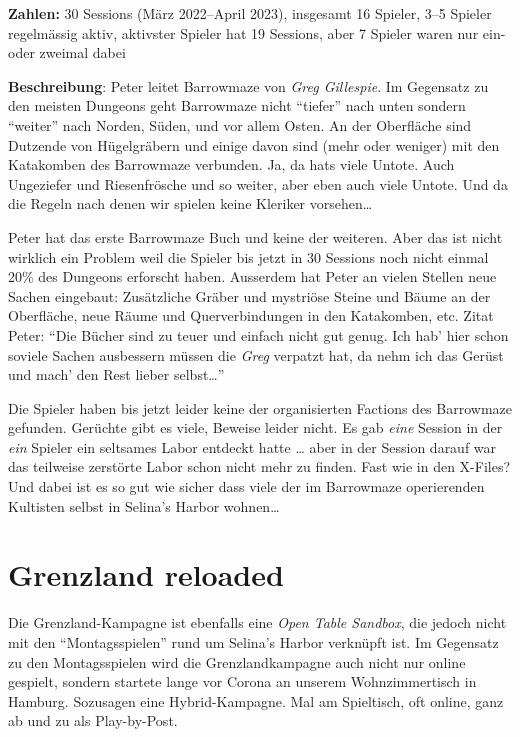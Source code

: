 \documentclass[11pt]{wbzine}
\begin{document}
\begin{multicols}{2}
\textbf{Zahlen:} 30 Sessions (März 2022--April 2023),
insgesamt 16 Spieler,
3--5 Spieler regelmässig aktiv,
aktivster Spieler hat 19 Sessions,
aber 7 Spieler waren nur ein- oder zweimal dabei

\textbf{Beschreibung}: Peter leitet Barrowmaze von \textit{Greg Gillespie}.
Im Gegensatz zu den meisten Dungeons geht Barrowmaze nicht ``tiefer'' nach
unten sondern ``weiter'' nach Norden, Süden, und vor allem Osten. An der
Oberfläche sind Dutzende von Hügelgräbern und einige davon sind (mehr oder
weniger) mit den Katakomben des Barrowmaze verbunden. Ja, da hats viele
Untote. Auch Ungeziefer und Riesenfrösche und so weiter, aber eben auch
viele Untote. Und da die Regeln nach denen wir spielen keine Kleriker
vorsehen\dots{}

Peter hat das erste Barrowmaze Buch und keine der weiteren. Aber das ist
nicht wirklich ein Problem weil die Spieler bis jetzt in 30 Sessions noch
nicht einmal 20\% des Dungeons erforscht haben. Ausserdem hat Peter an
vielen Stellen neue Sachen eingebaut: Zusätzliche Gräber und mystriöse
Steine und Bäume an der Oberfläche, neue Räume und Querverbindungen in
den Katakomben, etc. Zitat Peter: ``Die Bücher sind zu teuer und einfach
nicht gut genug. Ich hab' hier schon soviele Sachen ausbessern müssen die
\textit{Greg} verpatzt hat, da nehm ich das Gerüst und mach' den Rest
lieber selbst\dots{}''

Die Spieler haben bis jetzt leider keine der organisierten Factions des
Barrowmaze gefunden. Gerüchte gibt es viele, Beweise leider nicht. Es gab
\emph{eine} Session in der \emph{ein} Spieler ein seltsames Labor entdeckt
hatte \dots{} aber in der Session darauf war das teilweise zerstörte Labor
schon nicht mehr zu finden. Fast wie in den X-Files? Und dabei ist es so
gut wie sicher dass viele der im Barrowmaze operierenden Kultisten selbst
in Selina's Harbor wohnen\dots{}

\section{Grenzland reloaded}
\label{grenzland-reloaded}
Die Grenzland-Kampagne ist ebenfalls eine \textit{Open Table Sandbox},
die jedoch nicht mit den ``Montagsspielen'' rund um Selina's Harbor
verknüpft ist. Im Gegensatz zu den Montagsspielen wird die
Grenzlandkampagne auch nicht nur online gespielt, sondern startete
lange vor Corona an unserem Wohnzimmertisch in Hamburg. Sozusagen
eine Hybrid-Kampagne. Mal am Spieltisch, oft online, ganz ab und zu
als Play-by-Post.


\end{multicols}
\end{document}
